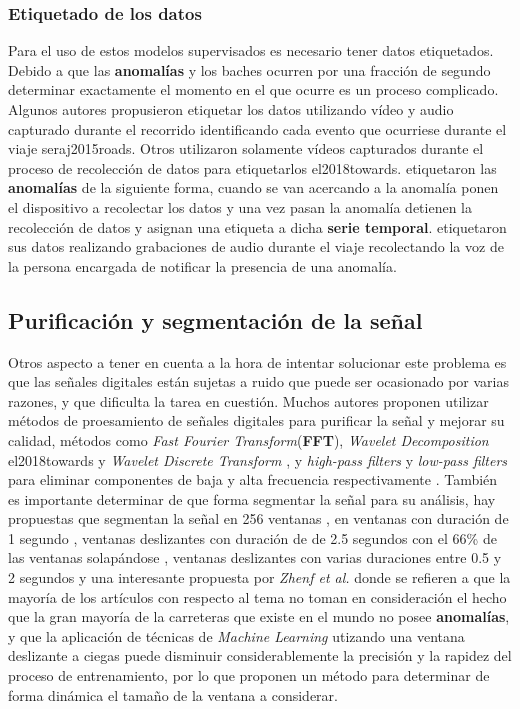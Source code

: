 		\subsubsection{Etiquetado de los datos}
			Para el uso de estos modelos supervisados es necesario tener datos etiquetados. Debido a que las \textbf{anomalías} y los baches ocurren por una 
			fracción de segundo determinar exactamente el momento en el que ocurre es un proceso complicado. Algunos autores propusieron etiquetar
			los datos utilizando vídeo y audio capturado durante el recorrido identificando cada evento que ocurriese durante el viaje \brackcite
			{seraj2015roads}. Otros utilizaron solamente vídeos capturados durante el proceso de recolección de datos para etiquetarlos \brackcite
			{el2018towards}.  etiquetaron las \textbf{anomalías} de la siguiente forma, cuando se van acercando a la anomalía
			ponen el dispositivo a recolectar los datos y una vez pasan la anomalía detienen la recolección de datos y asignan una etiqueta a dicha
			\textbf{serie temporal}.  etiquetaron sus datos realizando grabaciones de audio durante el viaje recolectando la voz 
			de la persona encargada de notificar la presencia de una anomalía.


	\subsection{Purificación y segmentación de la señal}
		Otros aspecto a tener en cuenta a la hora de intentar solucionar este problema es que las señales digitales están sujetas a ruido que puede ser
		ocasionado por varias razones, y que dificulta la tarea en cuestión. Muchos autores proponen utilizar métodos de proesamiento de señales digitales
		para purificar la señal y mejorar su calidad, métodos como \emph{Fast Fourier Transform}(\textbf{FFT}), \emph{Wavelet Decomposition} \brackcite
		{el2018towards} y \emph{Wavelet Discrete Transform} , y \emph{high-pass filters} y \emph{low-pass filters} para eliminar
		componentes de baja y alta frecuencia respectivamente . También es importante determinar de que
		forma segmentar la señal para su análisis, hay propuestas que segmentan la señal en 256 ventanas , en ventanas con
		duración de 1 segundo , ventanas deslizantes con duración de de 2.5 segundos con el 66\% de las ventanas solapándose
		, ventanas deslizantes con varias duraciones entre 0.5 y 2 segundos  y una interesante
		propuesta por \emph{Zhenf et al.} donde se refieren a que la mayoría de los artículos con respecto al tema no toman en consideración el hecho que la
		gran mayoría de la carreteras que existe en el mundo no posee \textbf{anomalías}, y que la aplicación de técnicas de \emph{Machine Learning} utizando
		una ventana deslizante a ciegas puede disminuir considerablemente la precisión y la rapidez del proceso de entrenamiento, por lo que proponen un método
		para determinar de forma dinámica el tamaño de la ventana a considerar.
		
